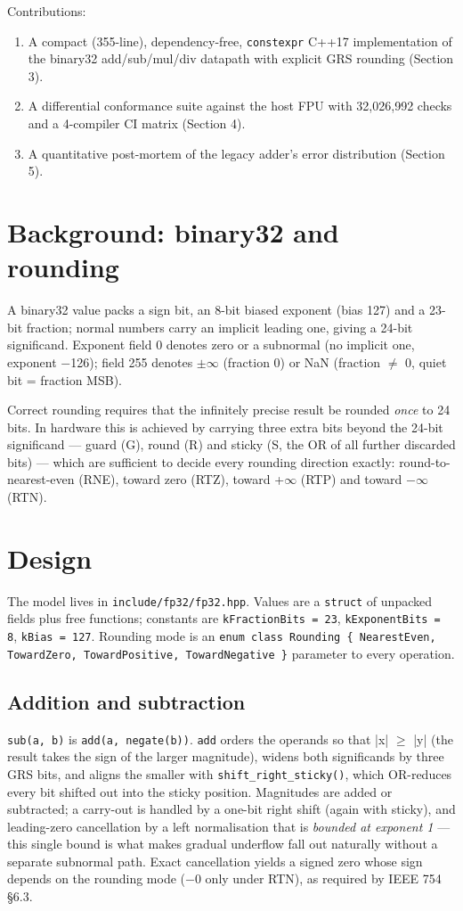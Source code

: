 \documentclass[11pt,a4paper]{article}
\begin{document}
Contributions:

\begin{enumerate}[nosep]
  \item A compact (355-line), dependency-free, \texttt{constexpr} C++17 implementation of the binary32 add/sub/mul/div datapath with explicit GRS rounding (Section 3).
  \item A differential conformance suite against the host FPU with 32,026,992 checks and a 4-compiler CI matrix (Section 4).
  \item A quantitative post-mortem of the legacy adder's error distribution (Section 5).
\end{enumerate}
\section{Background: binary32 and rounding}
A binary32 value packs a sign bit, an 8-bit biased exponent (bias 127) and a 23-bit fraction; normal numbers carry an implicit leading one, giving a 24-bit significand. Exponent field 0 denotes zero or a subnormal (no implicit one, exponent $-$126); field 255 denotes $\pm$$\infty$ (fraction 0) or NaN (fraction $\neq$ 0, quiet bit = fraction MSB).

Correct rounding requires that the infinitely precise result be rounded \emph{once} to 24 bits. In hardware this is achieved by carrying three extra bits beyond the 24-bit significand — guard (G), round (R) and sticky (S, the OR of all further discarded bits) — which are sufficient to decide every rounding direction exactly: round-to-nearest-even (RNE), toward zero (RTZ), toward +$\infty$ (RTP) and toward $-$$\infty$ (RTN).

\section{Design}
The model lives in \texttt{include/fp32/fp32.hpp}. Values are a \texttt{struct} of unpacked fields plus free functions; constants are \texttt{kFractionBits = 23}, \texttt{kExponentBits = 8}, \texttt{kBias = 127}. Rounding mode is an \texttt{enum class Rounding \{ NearestEven, TowardZero, TowardPositive, TowardNegative \}} parameter to every operation.

\subsection{Addition and subtraction}
\texttt{sub(a, b)} is \texttt{add(a, negate(b))}. \texttt{add} orders the operands so that |x| $\geq$ |y| (the result takes the sign of the larger magnitude), widens both significands by three GRS bits, and aligns the smaller with \texttt{shift\_right\_sticky()}, which OR-reduces every bit shifted out into the sticky position. Magnitudes are added or subtracted; a carry-out is handled by a one-bit right shift (again with sticky), and leading-zero cancellation by a left normalisation that is \emph{bounded at exponent 1} — this single bound is what makes gradual underflow fall out naturally without a separate subnormal path. Exact cancellation yields a signed zero whose sign depends on the rounding mode ($-$0 only under RTN), as required by IEEE 754 §6.3.
\end{document}
